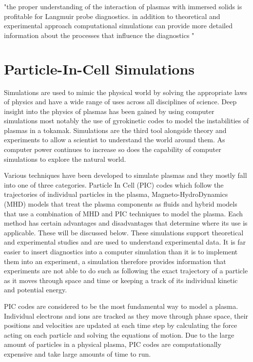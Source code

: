 \documentclass[12pt]{article}
\begin{document}
"the proper understanding of the interaction of plasmas with immersed solids is profitable for Langmuir probe diagnostics. in addition to theoretical and experimental approach computational simulations can provide more detailed information about the processes that influence the diagnostics "


\section{Particle-In-Cell Simulations} 
Simulations are used to mimic the physical world by solving the appropriate laws of physics and have a wide range of uses across all disciplines of science. Deep insight into the physics of plasmas has been gained by using computer simulations most notably the use of gyrokinetic codes to model the instabilities of plasmas in a tokamak. Simulations are the third tool alongside theory and experiments to allow a scientist to understand the world around them. As computer power continues to increase so does the capability of computer simulations to explore the natural world.

Various techniques have been developed to simulate plasmas and they mostly fall into one of three categories. Particle In Cell (PIC) codes which follow the trajectories of individual particles in the plasma, Magneto-HydroDynamics (MHD) models that treat the plasma components as fluids and hybrid models that use a combination of MHD and PIC techniques to model the plasma. Each method has certain advantages and disadvantages that determine where its use is applicable. These will be discussed below. These simulations support theoretical and experimental studies and are used to understand experimental data. It is far easier to insert diagnostics into a computer simulation than it is to implement them into an experiment, a simulation therefore provides information that experiments are not able to do such as following the exact trajectory of a particle as it moves through space and time or keeping a track of its individual kinetic and potential energy. 

PIC codes are considered to be the most fundamental way to model a plasma. Individual electrons and ions are tracked as they move through phase space, their positions and velocities are updated at each time step by calculating the force acting on each particle and solving the equations of motion. Due to the large amount of particles in a physical plasma, PIC codes are computationally expensive  and take large amounts of time to run. 
\end{document}
